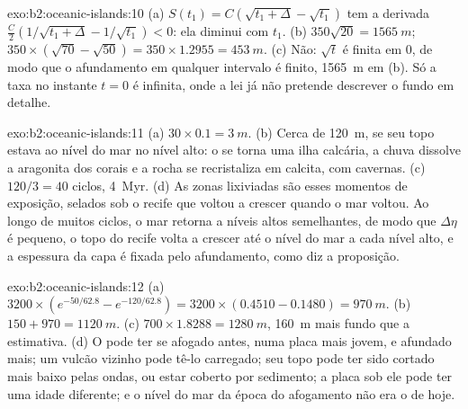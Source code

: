 \begin{solution}{exo:b2:oceanic-islands:10}
(a) $S(t_1) = C(\sqrt{t_1 + \Delta} - \sqrt{t_1})$ tem a derivada $\frac C2(1/\sqrt{t_1 +
\Delta} - 1/\sqrt{t_1}) < 0$: ela diminui com $t_1$. (b) $350\sqrt{20} = \qty{1565}{m}$; $350\times
(\sqrt{70} - \sqrt{50}) = 350\times1.2955 = \qty{453}{m}$. (c) Não: $\sqrt t$ é finita em $0$, de modo que
o afundamento em qualquer intervalo é finito, \qty{1565}{m} em (b). Só a taxa no instante $t = 0$
é infinita, onde a lei já não pretende descrever o fundo em detalhe.
\end{solution}

\begin{solution}{exo:b2:oceanic-islands:11}
(a) $30\times0.1 = \qty{3}{m}$. (b) Cerca de \qty{120}{m}, se seu topo estava ao nível do mar no
nível alto: o  se torna uma ilha calcária, a chuva dissolve a aragonita dos corais e a
rocha se recristaliza em calcita, com cavernas. (c) $120/3 = 40$ ciclos, \qty{4}{Myr}. (d) As zonas
lixiviadas são esses momentos de exposição, selados sob o recife que voltou a crescer quando o mar voltou.
Ao longo de muitos ciclos, o mar retorna a níveis altos semelhantes, de modo que $\Delta\eta$ é pequeno, o topo do recife
volta a crescer até o nível do mar a cada nível alto, e a espessura da capa é fixada pelo afundamento, como diz a
proposição.
\end{solution}

\begin{solution}{exo:b2:oceanic-islands:12}
(a) $3200\times(e^{-50/62.8} - e^{-120/62.8}) = 3200\times(0.4510 - 0.1480) = \qty{970}{m}$.
(b) $150 + 970 = \qty{1120}{m}$. (c) $700\times1.8288 = \qty{1280}{m}$, \qty{160}{m} mais fundo que a
estimativa. (d) O  pode ter se afogado antes, numa placa mais jovem, e afundado mais; um vulcão
vizinho pode tê-lo carregado; seu topo pode ter sido cortado mais baixo pelas ondas, ou estar coberto por sedimento; a
placa sob ele pode ter uma idade diferente; e o nível do mar da época do afogamento não era
o de hoje.
\end{solution}

